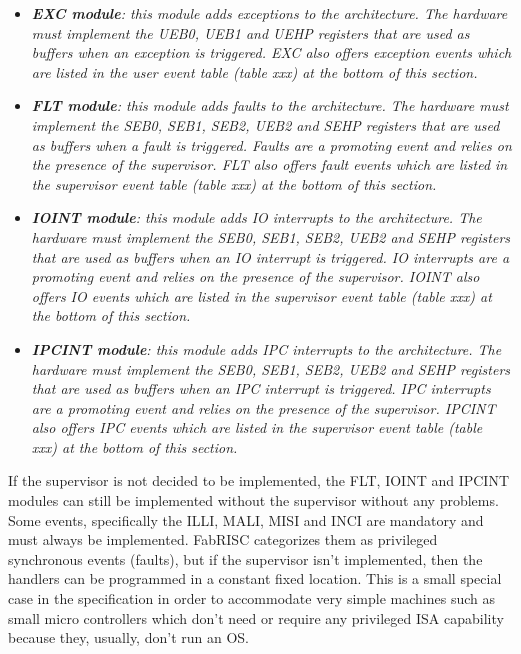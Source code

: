         \begin{itemize}

            \item \textit{\textbf{EXC module}: this module adds exceptions to the architecture. The hardware must implement the UEB0, UEB1 and UEHP registers that are used as buffers when an exception is triggered. EXC also offers exception events which are listed in the user event table (table xxx) at the bottom of this section.}

            \item \textit{\textbf{FLT module}: this module adds faults to the architecture. The hardware must implement the SEB0, SEB1, SEB2, UEB2 and SEHP registers that are used as buffers when a fault is triggered. Faults are a promoting event and relies on the presence of the supervisor. FLT also offers fault events which are listed in the supervisor event table (table xxx) at the bottom of this section.}

            \item \textit{\textbf{IOINT module}: this module adds IO interrupts to the architecture. The hardware must implement the SEB0, SEB1, SEB2, UEB2 and SEHP registers that are used as buffers when an IO interrupt is triggered. IO interrupts are a promoting event and relies on the presence of the supervisor. IOINT also offers IO events which are listed in the supervisor event table (table xxx) at the bottom of this section.}

            \item \textit{\textbf{IPCINT module}: this module adds IPC interrupts to the architecture. The hardware must implement the SEB0, SEB1, SEB2, UEB2 and SEHP registers that are used as buffers when an IPC interrupt is triggered. IPC interrupts are a promoting event and relies on the presence of the supervisor. IPCINT also offers IPC events which are listed in the supervisor event table (table xxx) at the bottom of this section.}

        \end{itemize}

        If the supervisor is not decided to be implemented, the FLT, IOINT and IPCINT modules can still be implemented without the supervisor without any problems. Some events, specifically the ILLI, MALI, MISI and INCI are mandatory and must always be implemented. FabRISC categorizes them as privileged synchronous events (faults), but if the supervisor isn't implemented, then the handlers can be programmed in a constant fixed location. This is a small special case in the specification in order to accommodate very simple machines such as small micro controllers which don't need or require any privileged ISA capability because they, usually, don't run an OS.

